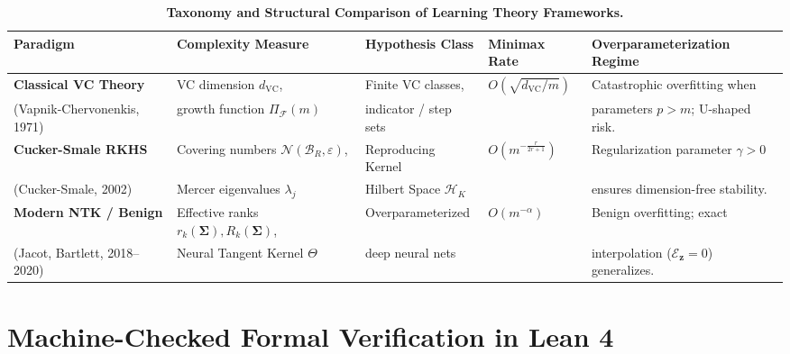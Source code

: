 \documentclass[11pt,a4paper]{article}
\theoremstyle{definition}
\begin{document}
\begin{table}[htbp]
\centering
\small
\caption{\textbf{Taxonomy and Structural Comparison of Learning Theory Frameworks.}}
\label{tab:learning_paradigms}
\begin{tabular}{@{}p{2.5cm}p{2.5cm}p{3.0cm}p{2.3cm}p{4.0cm}@{}}
\toprule
\textbf{Paradigm} & \textbf{Complexity Measure} & \textbf{Hypothesis Class} & \textbf{Minimax Rate} & \textbf{Overparameterization Regime} \\
\midrule
\textbf{Classical VC Theory} & VC dimension $d_{\text{VC}}$, & Finite VC classes, & $O(\sqrt{d_{\text{VC}}/m})$ & Catastrophic overfitting when \\
(Vapnik-Chervonenkis, 1971) & growth function $\Pi_{\mathcal{F}}(m)$ & indicator / step sets & & parameters $p > m$; U-shaped risk. \\
\addlinespace
\textbf{Cucker-Smale RKHS} & Covering numbers $\mathcal{N}(\mathcal{B}_R, \varepsilon)$, & Reproducing Kernel & $O\left(m^{-\frac{r}{2r+1}}\right)$ & Regularization parameter $\gamma > 0$ \\
(Cucker-Smale, 2002) & Mercer eigenvalues $\lambda_j$ & Hilbert Space $\mathcal{H}_K$ & & ensures dimension-free stability. \\
\addlinespace
\textbf{Modern NTK / Benign} & Effective ranks $r_k(\mathbf{\Sigma}), R_k(\mathbf{\Sigma})$, & Overparameterized & $O(m^{-\alpha})$ & Benign overfitting; exact \\
(Jacot, Bartlett, 2018--2020) & Neural Tangent Kernel $\Theta$ & deep neural nets & & interpolation ($\mathcal{E}_{\mathbf{z}}=0$) generalizes. \\
\bottomrule
\end{tabular}
\end{table}

\section{Machine-Checked Formal Verification in Lean 4}\label{sec:lean_formalization}
\end{document}
